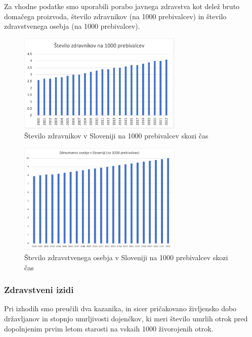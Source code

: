 \documentclass[12pt,a4paper]{article}
\theoremstyle{definition}
\begin{document}
Za vhodne podatke smo uporabili porabo javnega zdravstva kot delež bruto domačega proizvoda, 
število zdravnikov (na 1000 prebivalcev) in število zdravstvenega osebja (na 1000 prebivalcev).

\begin{figure}[H]
    \centering
    \includegraphics[width=0.7\textwidth]{zdravniki_1000_slo.png}
    \caption{Število zdravnikov v Sloveniji na 1000 prebivalcev skozi čas}
    \label{fig:zdravniki_1000_slo.png}
  \end{figure}

  \begin{figure}[H]
    \centering
    \includegraphics[width=0.7\textwidth]{zdr_osebje_1000_slo.png}
    \caption{Število zdravstvenega osebja v Sloveniji na 1000 prebivalcev skozi čas}
    \label{fig:zdr_osebje_1000_slo.png}
  \end{figure}

\subsubsection{Zdravstveni izidi}

Pri izhodih smo preučili dva kazanika, in sicer pričakovano življensko dobo državljanov in stopnjo umrljivosti dojenčkov, ki meri število umrlih otrok pred dopolnjenim prvim letom starosti na vskaih 1000 živorojenih otrok.
\end{document}

